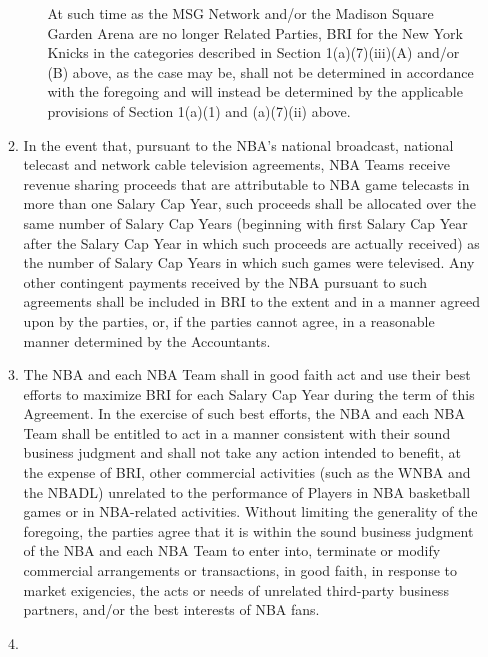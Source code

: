 \documentclass[
]{book}
\begin{document}
\begin{enumerate}
\begin{enumerate}
\begin{enumerate}
      At such time as the MSG Network and/or the Madison Square Garden Arena are no longer Related Parties, BRI for the New York Knicks in the categories described in Section 1(a)(7)(iii)(A) and/or (B) above, as the case may be, shall not be determined in accordance with the foregoing and will instead be determined by the applicable provisions of Section 1(a)(1) and (a)(7)(ii) above.
    \end{enumerate}
  \item
    In the event that, pursuant to the NBA's national broadcast, national telecast and network cable television agreements, NBA Teams receive revenue sharing proceeds that are attributable to NBA game telecasts in more than one Salary Cap Year, such proceeds shall be allocated over the same number of Salary Cap Years (beginning with first Salary Cap Year after the Salary Cap Year in which such proceeds are actually received) as the number of Salary Cap Years in which such games were televised. Any other contingent payments received by the NBA pursuant to such agreements shall be included in BRI to the extent and in a manner agreed upon by the parties, or, if the parties cannot agree, in a reasonable manner determined by the Accountants.
  \item
    The NBA and each NBA Team shall in good faith act and use their best efforts to maximize BRI for each Salary Cap Year during the term of this Agreement. In the exercise of such best efforts, the NBA and each NBA Team shall be entitled to act in a manner consistent with their sound business judgment and shall not take any action intended to benefit, at the expense of BRI, other commercial activities (such as the WNBA and the NBADL) unrelated to the performance of Players in NBA basketball games or in NBA-related activities. Without limiting the generality of the foregoing, the parties agree that it is within the sound business judgment of the NBA and each NBA Team to enter into, terminate or modify commercial arrangements or transactions, in good faith, in response to market exigencies, the acts or needs of unrelated third-party business partners, and/or the best interests of NBA fans.
  \item

\end{enumerate}
\end{enumerate}
\end{document}
